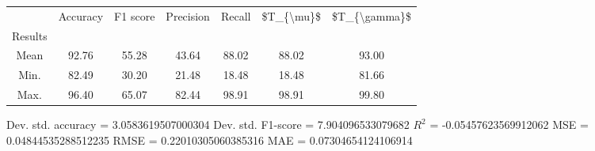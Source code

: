 \begin{tabular}{|c|c|c|c|c|c|c|}
\toprule
{} &  Accuracy &  F1 score &  Precision &  Recall &  \$T\_\{\textbackslash mu\}\$ &  \$T\_\{\textbackslash gamma\}\$ \\
Results &           &           &            &         &            &               \\
\hline
Mean    &     92.76 &     55.28 &      43.64 &   88.02 &      88.02 &         93.00 \\
Min.    &     82.49 &     30.20 &      21.48 &   18.48 &      18.48 &         81.66 \\
Max.    &     96.40 &     65.07 &      82.44 &   98.91 &      98.91 &         99.80 \\
\bottomrule
\end{tabular}

 Dev. std. accuracy = 3.0583619507000304
 Dev. std. F1-score = 7.904096533079682
 $R^2$ = -0.05457623569912062
 MSE = 0.04844535288512235
 RMSE = 0.22010305060385316
 MAE = 0.07304654124106914